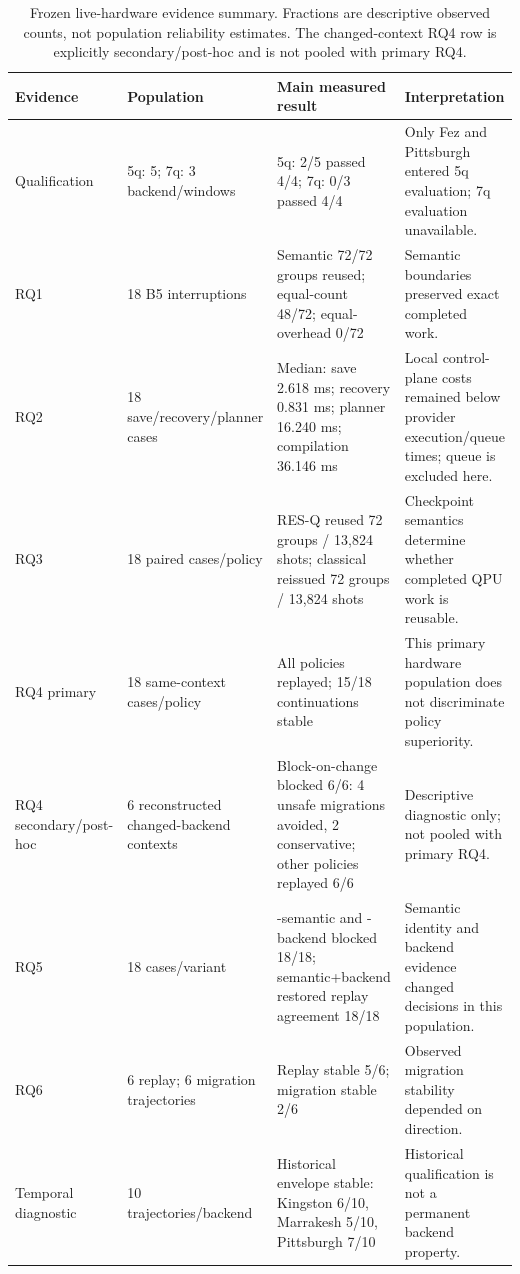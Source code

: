 \begin{table}[t]
\centering
\small
\caption{Frozen live-hardware evidence summary. Fractions are descriptive observed counts, not population reliability estimates. The changed-context RQ4 row is explicitly secondary/post-hoc and is not pooled with primary RQ4.}
\label{tab:hardware-summary}
\begin{tabular}{@{}p{}p{}p{}p{}@{}}
\toprule
\textbf{Evidence} & \textbf{Population} & \textbf{Main measured result} & \textbf{Interpretation} \\
\midrule
Qualification & 5q: 5; 7q: 3 backend/windows & 5q: 2/5 passed 4/4; 7q: 0/3 passed 4/4 & Only Fez and Pittsburgh entered 5q evaluation; 7q evaluation unavailable. \\
RQ1 & 18 B5 interruptions & Semantic 72/72 groups reused; equal-count 48/72; equal-overhead 0/72 & Semantic boundaries preserved exact completed work. \\
RQ2 & 18 save/recovery/planner cases & Median: save 2.618 ms; recovery 0.831 ms; planner 16.240 ms; compilation 36.146 ms & Local control-plane costs remained below provider execution/queue times; queue is excluded here. \\
RQ3 & 18 paired cases/policy & RES-Q reused 72 groups / 13,824 shots; classical reissued 72 groups / 13,824 shots & Checkpoint semantics determine whether completed QPU work is reusable. \\
RQ4 primary & 18 same-context cases/policy & All policies replayed; 15/18 continuations stable & This primary hardware population does not discriminate policy superiority. \\
RQ4 secondary/post-hoc & 6 reconstructed changed-backend contexts & Block-on-change blocked 6/6: 4 unsafe migrations avoided, 2 conservative; other policies replayed 6/6 & Descriptive diagnostic only; not pooled with primary RQ4. \\
RQ5 & 18 cases/variant & -semantic and -backend blocked 18/18; semantic+backend restored replay agreement 18/18 & Semantic identity and backend evidence changed decisions in this population. \\
RQ6 & 6 replay; 6 migration trajectories & Replay stable 5/6; migration stable 2/6 & Observed migration stability depended on direction. \\
Temporal diagnostic & 10 trajectories/backend & Historical envelope stable: Kingston 6/10, Marrakesh 5/10, Pittsburgh 7/10 & Historical qualification is not a permanent backend property. \\
\bottomrule
\end{tabular}
\end{table}
